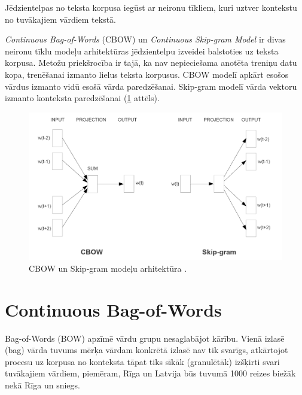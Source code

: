 Jēdzientelpas no teksta korpusa iegūst ar neironu tīkliem, kuri uztver kontekstu no tuvākajiem vārdiem tekstā.

\textit{Continuous Bag-of-Words} (CBOW) un \textit{Continuous Skip-gram Model} ir divas neironu tīklu modeļu arhitektūras jēdzientelpu izveidei balstoties uz teksta korpusa. Metožu priekšrocība ir tajā, ka nav nepieciešama anotēta treniņu datu kopa, trenēšanai izmanto lielus teksta korpusus. CBOW modelī apkārt esošos vārdus izmanto vidū esošā vārda paredzēšanai. Skip-gram modelī vārda vektoru izmanto konteksta paredzēšanai (\ref{fig:cbow-skipgram} attēls).

\begin{figure}[h]
	\centering
	\includegraphics[width=\textwidth]{figures/word2vec-models.png}
	\caption{CBOW un Skip-gram modeļu arhitektūra \cite{word2vec2013}.}
	\label{fig:cbow-skipgram}
\end{figure}







\section{Continuous Bag-of-Words}

Bag-of-Words (BOW) apzīmē vārdu grupu nesaglabājot kārību. Vienā izlasē (bag) vārda tuvums mērķa vārdam konkrētā izlasē nav tik svarīgs, atkārtojot procesu uz korpusa no konteksta tāpat tiks sīkāk (granulētāk) izšķirti svari tuvākajiem vārdiem, piemēram, Rīga un Latvija būs tuvumā 1000 reizes biežāk nekā Rīga un sniegs.

